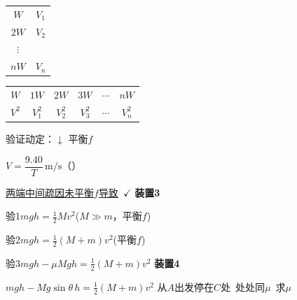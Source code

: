 
\begin{tabular}{@{}c@{\qquad}c@{}}
$W$ & $V_1$ \\
$2W$ & $V_2$ \\
$\vdots$ & \\
$nW$ & $V_n$
\end{tabular}

\begin{center}
\begin{tabular}{|c|c|c|c|c|c|}
\hline
$W$ & $1W$ & $2W$ & $3W$ & $\cdots$ & $nW$ \\
$V^2$ & $V_1^2$ & $V_2^2$ & $V_3^2$ & $\cdots$ & $V_n^2$ \\
\hline
\end{tabular}
\end{center}

验证动定：$\downarrow$ 平衡$f$




$V=\dfrac{9.40}{T}\,\mathrm{m/s}$（）\quad {}\quad {}\quad {}

\underline{两端中间疏因未平衡$f$导致}\ $\checkmark$
\textbf{装置3}


验1\quad $mgh=\frac{1}{2}Mv^2$\quad ($M\gg m$，平衡$f$)

验2\quad $mgh=\frac{1}{2}(M+m)v^2$\quad (平衡$f$)

验3\quad $mgh-\mu Mgh=\frac{1}{2}(M+m)v^2$
\textbf{装置4}


$mgh-Mg\sin\theta\,h=\frac{1}{2}(M+m)v^2$
从$A$出发停在$C$处\ 处处同$\mu$\ 求$\mu$


